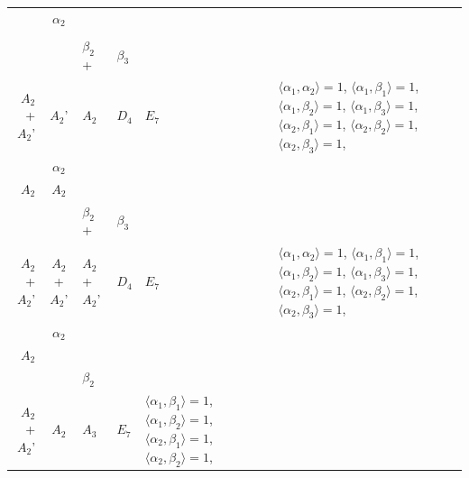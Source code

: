 \documentclass[12pt]{report}
\begin{document}
\begin{appendix}
{\begin{longtable}{rcl p{1cm}p{1cm}p{3cm} }
\\
\begin{tabular}{cc}$\alpha_1$+ & $\alpha_2$\\\tiny{  } & \tiny{  }\end{tabular} &\begin{tabular}{c} = \\~ \end{tabular} & \begin{tabular}{ccc}$\beta_1$+ & $\beta_2$+ & $\beta_3$\\\tiny{ $A_2$+$A_2$' } & \tiny{ $A_2$' } & \tiny{ $A_2$ }\end{tabular} & $D_4$ & $E_7$ & $\langle\alpha_1, \alpha_2\rangle=1$,  $\langle\alpha_1, \beta_1\rangle=1$, $\langle\alpha_1, \beta_2\rangle=1$, $\langle\alpha_1, \beta_3\rangle=1$, $\langle\alpha_2, \beta_1\rangle=1$, $\langle\alpha_2, \beta_2\rangle=1$, $\langle\alpha_2, \beta_3\rangle=1$, 
\\
\begin{tabular}{cc}$\alpha_1$+ & $\alpha_2$\\\tiny{ $A_2$ } & \tiny{ $A_2$ }\end{tabular} &\begin{tabular}{c} = \\~ \end{tabular} & \begin{tabular}{ccc}$\beta_1$+ & $\beta_2$+ & $\beta_3$\\\tiny{ $A_2$+$A_2$' } & \tiny{ $A_2$+$A_2$' } & \tiny{ $A_2$+$A_2$' }\end{tabular} & $D_4$ & $E_7$ & $\langle\alpha_1, \alpha_2\rangle=1$,  $\langle\alpha_1, \beta_1\rangle=1$, $\langle\alpha_1, \beta_2\rangle=1$, $\langle\alpha_1, \beta_3\rangle=1$, $\langle\alpha_2, \beta_1\rangle=1$, $\langle\alpha_2, \beta_2\rangle=1$, $\langle\alpha_2, \beta_3\rangle=1$, 
\\
\begin{tabular}{cc}$\alpha_1$+ & $\alpha_2$\\\tiny{ $A_2$ } & \tiny{  }\end{tabular} &\begin{tabular}{c} = \\~ \end{tabular} & \begin{tabular}{cc}$\beta_1$+ & $\beta_2$\\\tiny{ $A_2$+$A_2$' } & \tiny{ $A_2$ }\end{tabular} & $A_3$ & $E_7$ &  $\langle\alpha_1, \beta_1\rangle=1$, $\langle\alpha_1, \beta_2\rangle=1$, $\langle\alpha_2, \beta_1\rangle=1$, $\langle\alpha_2, \beta_2\rangle=1$, 

\end{longtable}}
\end{appendix}
\end{document}
